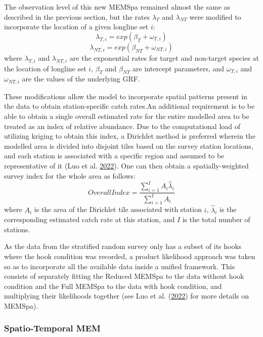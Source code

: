 \documentclass[12pt]{article}\usepackage[]{graphicx}\usepackage[]{color}
\begin{document}
The observation level of this new MEMSpa remained almost the same as described in the previous section, but the rates \(\lambda_T\) and \(\lambda_{NT}\) were modified to incorporate the location of a given longline set \(i\):
\begin{equation}
\lambda_{T,i} = exp(\beta_T+\omega_{T,i})
\end{equation} \begin{equation}
\lambda_{NT,i} = exp(\beta_{NT}+\omega_{NT,i})
\end{equation}
where \(\lambda_{T,i}\) and \(\lambda_{NT,i}\) are the exponential rates for target and non-target species at the location of longline set \(i\), \(\beta_T\) and \(\beta_{NT}\) are intercept parameters, and \(\omega_{T,i}\) and \(\omega_{NT,i}\) are the values of the underlying GRF.

These modifications allow the model to incorporate spatial patterns present in the data to obtain station-specific catch rates.An additional requirement is to be able to obtain a single overall estimated rate for the entire modelled area to be treated as an index of relative abundance. Due to the computational load of utilizing kriging to obtain this index, a Dirichlet method is preferred wherein the modelled area is divided into disjoint tiles based on the survey station locations, and each station is associated with a specific region and assumed to be representative of it (Luo et al. \protect\hyperlink{ref-Luo2022}{2022}). One can then obtain a spatially-weighted survey index for the whole area as follows:
\begin{equation}
Overall Index = \frac{\sum_{i=1}^I A_i \hat{\lambda}_i}{\sum_{i=1}^I A_i}
\end{equation}
where \(A_i\) is the area of the Dirichlet tile associated with station \(i\), \(\hat{\lambda}_i\) is the corresponding estimated catch rate at this station, and \(I\) is the total number of stations.

As the data from the stratified random survey only has a subset of its hooks where the hook condition was recorded, a product likelihood approach was taken so as to incorporate all the available data inside a unified framework. This consists of separately fitting the Reduced MEMSpa to the data without hook condition and the Full MEMSpa to the data with hook condition, and multiplying their likelihoods together (see Luo et al. (\protect\hyperlink{ref-Luo2022}{2022}) for more details on MEMSpa).

\hypertarget{spatio-temporal-mem}{%
\subsubsection{Spatio-Temporal MEM}\label{spatio-temporal-mem}}
\end{document}
